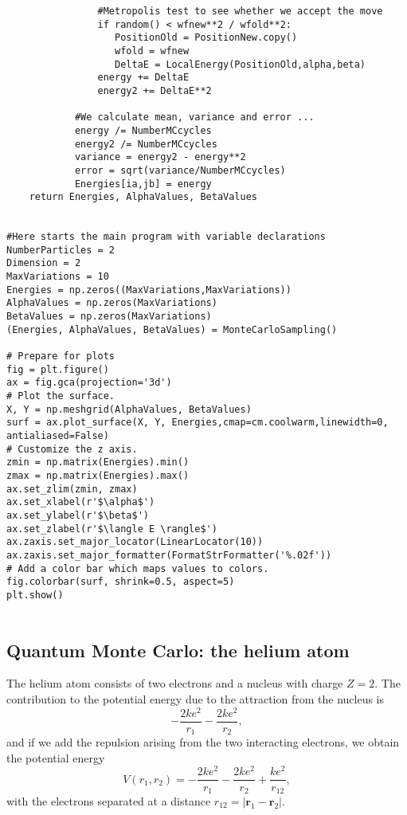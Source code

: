 \begin{verbatim}
                #Metropolis test to see whether we accept the move
                if random() < wfnew**2 / wfold**2:
                   PositionOld = PositionNew.copy()
                   wfold = wfnew
                   DeltaE = LocalEnergy(PositionOld,alpha,beta)
                energy += DeltaE
                energy2 += DeltaE**2

            #We calculate mean, variance and error ...
            energy /= NumberMCcycles
            energy2 /= NumberMCcycles
            variance = energy2 - energy**2
            error = sqrt(variance/NumberMCcycles)
            Energies[ia,jb] = energy    
    return Energies, AlphaValues, BetaValues


#Here starts the main program with variable declarations
NumberParticles = 2
Dimension = 2
MaxVariations = 10
Energies = np.zeros((MaxVariations,MaxVariations))
AlphaValues = np.zeros(MaxVariations)
BetaValues = np.zeros(MaxVariations)
(Energies, AlphaValues, BetaValues) = MonteCarloSampling()

# Prepare for plots
fig = plt.figure()
ax = fig.gca(projection='3d')
# Plot the surface.
X, Y = np.meshgrid(AlphaValues, BetaValues)
surf = ax.plot_surface(X, Y, Energies,cmap=cm.coolwarm,linewidth=0, antialiased=False)
# Customize the z axis.
zmin = np.matrix(Energies).min()
zmax = np.matrix(Energies).max()
ax.set_zlim(zmin, zmax)
ax.set_xlabel(r'$\alpha$')
ax.set_ylabel(r'$\beta$')
ax.set_zlabel(r'$\langle E \rangle$')
ax.zaxis.set_major_locator(LinearLocator(10))
ax.zaxis.set_major_formatter(FormatStrFormatter('%.02f'))
# Add a color bar which maps values to colors.
fig.colorbar(surf, shrink=0.5, aspect=5)
plt.show()


\end{verbatim}


\subsection*{Quantum Monte Carlo: the helium atom}

The helium atom consists of two electrons and a nucleus with
charge $Z=2$. 
The contribution  
to the potential energy due to the attraction from the nucleus is
\[
   -\frac{2ke^2}{r_1}-\frac{2ke^2}{r_2},
\] 
and if we add the repulsion arising from the two 
interacting electrons, we obtain the potential energy
\[
 V(r_1, r_2)=-\frac{2ke^2}{r_1}-\frac{2ke^2}{r_2}+
               \frac{ke^2}{r_{12}},
\]
with the electrons separated at a distance 
$r_{12}=|\bm{r}_1-\bm{r}_2|$.

